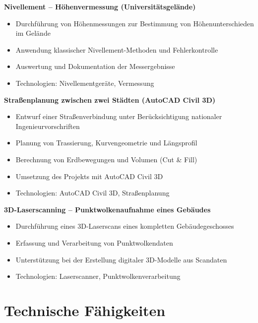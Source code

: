 \documentclass[a4paper,10pt]{article}
\begin{document}
\vspace{0.35em}

\textbf{Nivellement -- Höhenvermessung (Universitätsgelände)}\\
\begin{itemize}[leftmargin=1.5em, noitemsep]
    \item Durchführung von Höhenmessungen zur Bestimmung von Höhenunterschieden im Gelände
    \item Anwendung klassischer Nivellement-Methoden und Fehlerkontrolle
    \item Auswertung und Dokumentation der Messergebnisse
    \item Technologien: Nivellementgeräte, Vermessung
\end{itemize}

\vspace{0.35em}

\textbf{Straßenplanung zwischen zwei Städten (AutoCAD Civil 3D)}\\
\begin{itemize}[leftmargin=1.5em, noitemsep]
    \item Entwurf einer Straßenverbindung unter Berücksichtigung nationaler Ingenieurvorschriften
    \item Planung von Trassierung, Kurvengeometrie und Längsprofil
    \item Berechnung von Erdbewegungen und Volumen (Cut \& Fill)
    \item Umsetzung des Projekts mit AutoCAD Civil 3D
    \item Technologien: AutoCAD Civil 3D, Straßenplanung
\end{itemize}

\vspace{0.35em}

\textbf{3D-Laserscanning -- Punktwolkenaufnahme eines Gebäudes}\\
\begin{itemize}[leftmargin=1.5em, noitemsep]
    \item Durchführung eines 3D-Laserscans eines kompletten Gebäudegeschosses
    \item Erfassung und Verarbeitung von Punktwolkendaten
    \item Unterstützung bei der Erstellung digitaler 3D-Modelle aus Scandaten
    \item Technologien: Laserscanner, Punktwolkenverarbeitung
\end{itemize}
\section*{Technische Fähigkeiten}
\end{document}
